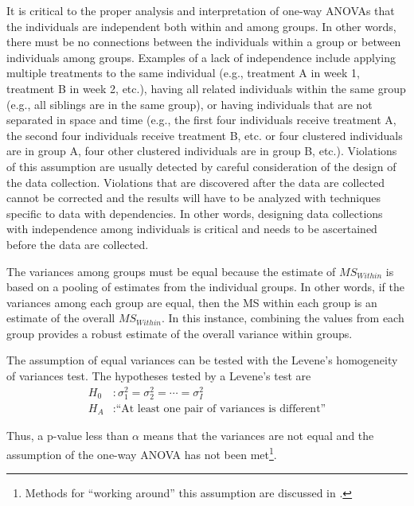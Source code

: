 \documentclass[10pt,openany]{book}\usepackage[]{graphicx}\usepackage[]{color}
\begin{document}

It is critical to the proper analysis and interpretation of one-way ANOVAs that the individuals are independent both within and among groups.  In other words, there must be no connections between the individuals within a group or between individuals among groups.  Examples of a lack of independence include applying multiple treatments to the same individual (e.g., treatment A in week 1, treatment B in week 2, etc.), having all related individuals within the same group (e.g., all siblings are in the same group), or having individuals that are not separated in space and time (e.g., the first four individuals receive treatment A, the second four individuals receive treatment B, etc. or four clustered individuals are in group A, four other clustered individuals are in group B, etc.).  Violations of this assumption are  usually detected by careful consideration of the design of the data collection.  Violations that are discovered after the data are collected cannot be corrected and the results will have to be analyzed with techniques specific to data  with dependencies.  In other words, designing data collections with independence among individuals is critical and needs to be ascertained before the data are collected.


The variances among groups must be equal because the estimate of $MS_{Within}$ is based on a pooling of estimates from the individual groups.  In other words, if the variances among each group are equal, then the MS within each group is an estimate of the overall $MS_{Within}$.  In this instance, combining the values from each group provides a robust estimate of the overall variance within groups.

The assumption of equal variances can be tested with the Levene's homogeneity of variances test.  The hypotheses tested by a Levene's test are
\[ \begin{split}
   H_{0}&: \sigma_{1}^{2}=\sigma_{2}^{2}=\cdots=\sigma_{I}^{2} \\
   H_{A}&:\text{``At least one pair of variances is different''}
\end{split} \]

Thus, a p-value less than $\alpha$ means that the variances are not equal and the assumption of the one-way ANOVA has not been met\footnote{Methods for ``working around'' this assumption are discussed in .}.
\end{document}
